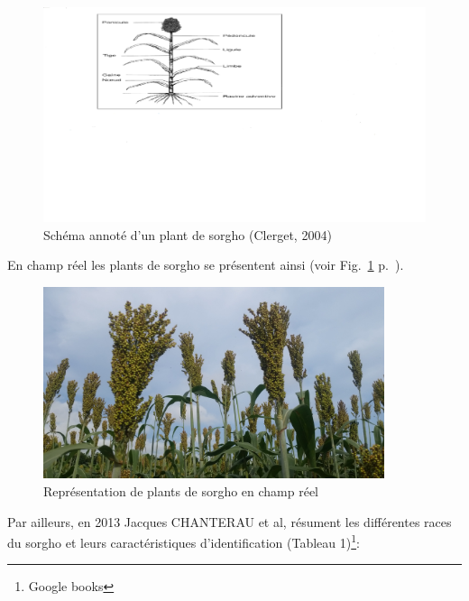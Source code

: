 \documentclass[a4paper,11pt]{article}
\begin{document}

 \begin{figure}%
  \begin{center}
    \includegraphics[width=18cm]{images/Schema_Plant_Sorgho}
  \end{center}
  \caption{Schéma annoté d’un plant de sorgho (Clerget, 2004)}
  \label{fig-Schema_plant_sorgho}
  \end{figure}


En champ réel les plants de sorgho se présentent ainsi (voir
Fig.~\ref{fig-Schema_plant_sorgho}
p.~\pageref{fig-Schema_plant_sorgho}).

\begin{figure}%
  \begin{center}
    \includegraphics[width=10cm]{images/PlantDeSorgho}
  \end{center}
\caption{Représentation de plants de sorgho en champ réel}
\end{figure}


Par ailleurs, en 2013 Jacques CHANTERAU et al, résument les
différentes races du sorgho et leurs caractéristiques d'identification
(Tableau 1)\footnote{Google books}:

\end{document}
